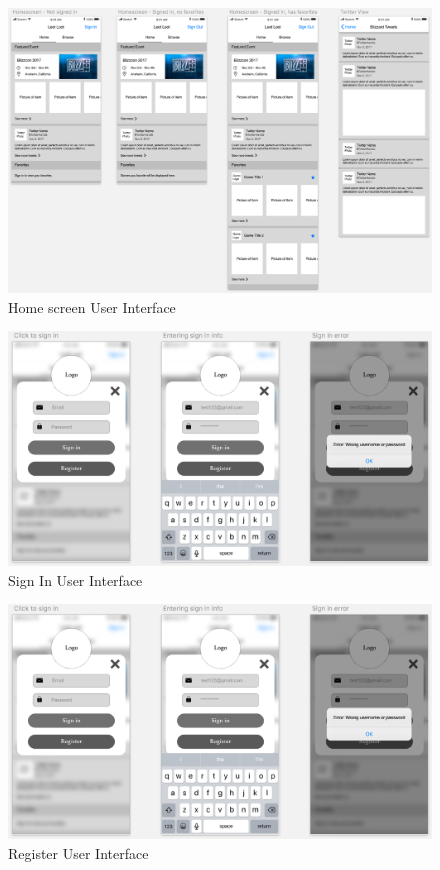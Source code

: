 \documentclass[onecolumn, draftclsnofoot,10pt, compsoc]{IEEEtran}
\begin{document}
\begin{figure}[H]
\centering
\captionsetup{justification=centering}
\includegraphics[scale=.50]{Homescreen}
\caption{Home screen User Interface}
\end{figure}

\begin{figure}[H]
\centering
\captionsetup{justification=centering}
\includegraphics[scale=.50]{SignIn}
\caption{Sign In User Interface}
\end{figure}

\begin{figure}[H]
\centering
\captionsetup{justification=centering}
\includegraphics[scale=.50]{SignIn}
\caption{Register User Interface}
\captionsetup{justification=centering}
\end{figure}
\end{document}
